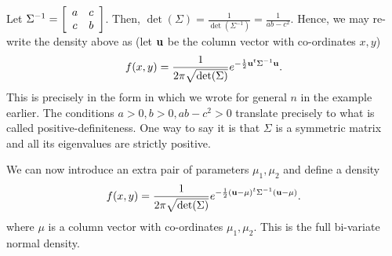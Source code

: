 \documentclass[preprint,  11pt]{amsart}
\begin{document}

 Let $\Sigma^{-1}=\left[\begin{array}{cc} a & c \\ c & b \end{array}\right]$. Then, $\det(\Sigma)=\frac{1}{\det(\Sigma^{-1})}=\frac{1}{ab-c^{2}}$. Hence, we may re-write the density above as (let $\mathbf{u}$ be the column vector with co-ordinates $x,y$)
$$
f(x,y) = \frac{1}{2\pi \sqrt{\det(\Sigma)}} e^{-\frac{1}{2}\mathbf{u}^{t}\Sigma^{-1}\mathbf{u} }.
$$
This is precisely in the form in which we wrote for general $n$ in the example earlier. The conditions $a>0,b>0,ab-c^{2}>0$ translate precisely to what is called positive-definiteness. One way to say it is that $\Sigma$ is a symmetric matrix and all its eigenvalues are strictly positive.

 We can now introduce an extra pair of parameters $\mu_{1},\mu_{2}$ and define a density
$$
f(x,y) = \frac{1}{2\pi \sqrt{\det(\Sigma)}} e^{-\frac{1}{2}(\mathbf{u}-\mu)^{t}\Sigma^{-1}(\mathbf{u}-\mu) }.
$$
where $\mu$ is a column vector with co-ordinates $\mu_{1},\mu_{2}$. This is the full bi-variate normal density.
\end{document}
